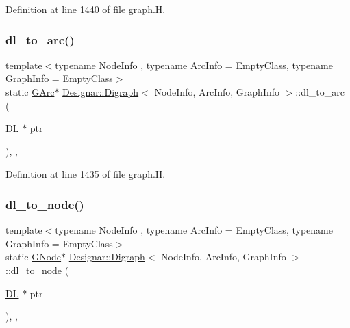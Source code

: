 Definition at line 1440 of file graph.\+H.

\mbox{\label{class_designar_1_1_digraph_af9581e9d0825da11ce153bd055149f7f}} 
\subsubsection{\texorpdfstring{dl\+\_\+to\+\_\+arc()}{dl\_to\_arc()}}
{\footnotesize\ttfamily template$<$typename Node\+Info , typename Arc\+Info  = Empty\+Class, typename Graph\+Info  = Empty\+Class$>$ \\
static \hyperlink{class_designar_1_1_digraph_a341acf8fb0195a8986158c29c4db1a89}{G\+Arc}$\ast$ \hyperlink{class_designar_1_1_digraph}{Designar\+::\+Digraph}$<$ Node\+Info, Arc\+Info, Graph\+Info $>$\+::dl\+\_\+to\+\_\+arc (\begin{DoxyParamCaption}\item[{\hyperlink{class_designar_1_1_d_l}{DL} $\ast$}]{ptr }\end{DoxyParamCaption})\hspace{0.3cm}{\ttfamily [inline]}, {\ttfamily [static]}, {\ttfamily [protected]}}



Definition at line 1435 of file graph.\+H.

\mbox{\label{class_designar_1_1_digraph_adbb91274c17d6087fdd5721e3f9b1f7c}} 
\subsubsection{\texorpdfstring{dl\+\_\+to\+\_\+node()}{dl\_to\_node()}}
{\footnotesize\ttfamily template$<$typename Node\+Info , typename Arc\+Info  = Empty\+Class, typename Graph\+Info  = Empty\+Class$>$ \\
static \hyperlink{class_designar_1_1_digraph_a33b0d2b8820ada501522b0e67e63524a}{G\+Node}$\ast$ \hyperlink{class_designar_1_1_digraph}{Designar\+::\+Digraph}$<$ Node\+Info, Arc\+Info, Graph\+Info $>$\+::dl\+\_\+to\+\_\+node (\begin{DoxyParamCaption}\item[{\hyperlink{class_designar_1_1_d_l}{DL} $\ast$}]{ptr }\end{DoxyParamCaption})\hspace{0.3cm}{\ttfamily [inline]}, {\ttfamily [static]}, {\ttfamily [protected]}}



